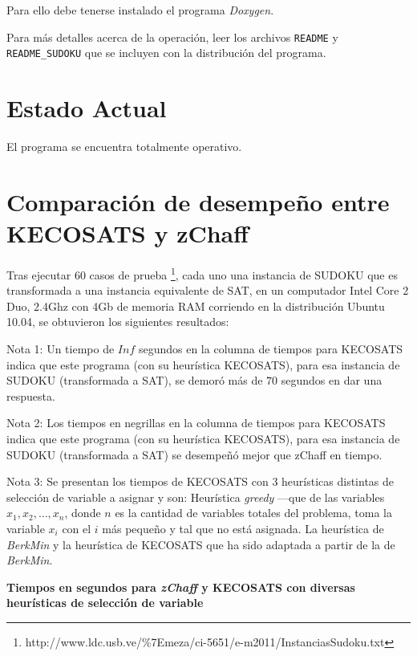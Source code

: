 \documentclass[12pt,lettersize,oneside]{article}
\begin{document}
Para ello debe tenerse instalado el programa \emph{Doxygen}.

Para más detalles acerca de la operación, leer los archivos {\tt README} y {\tt
  README\_SUDOKU} que se incluyen con la distribución del programa.
\section{Estado Actual}
El programa se encuentra totalmente operativo.

\section{Comparación de desempeño entre KECOSATS y zChaff}

Tras ejecutar $60$ casos de prueba
\footnote{http://www.ldc.usb.ve/\%7Emeza/ci-5651/e-m2011/InstanciasSudoku.txt},
cada uno una instancia de SUDOKU que es transformada a una instancia equivalente
de SAT, en un computador Intel Core 2 Duo, 2.4Ghz con 4Gb de memoria RAM
corriendo en la distribución Ubuntu 10.04, se
obtuvieron los siguientes resultados:

Nota 1: Un tiempo de $Inf$ segundos en la columna de tiempos para KECOSATS
indica que este programa (con su heurística KECOSATS), para esa instancia de
SUDOKU (transformada a SAT), se demoró más de $70$ segundos en dar una
respuesta.

Nota 2: Los tiempos en negrillas en la columna de tiempos para KECOSATS indica
que este programa (con su heurística KECOSATS), para esa instancia de SUDOKU
(transformada a SAT) se desempeñó mejor que zChaff en tiempo.

Nota 3: Se presentan los tiempos de KECOSATS con 3 heurísticas distintas de
selección de variable a asignar y son: Heurística \emph{greedy} ---que
de las variables $x_1,x_2,\ldots,x_n$, donde $n$ es la cantidad de variables
totales del problema, toma la variable $x_i$ con el $i$ más pequeño y tal que no
está asignada. La heurística de \emph{BerkMin} y la heurística de KECOSATS que
ha sido adaptada a partir de la de \emph{BerkMin}.
\begin{center}\textbf{ Tiempos en segundos para \emph{zChaff} y KECOSATS con diversas heurísticas de selección de variable}\end{center}\vspace{-2.5mm}

\end{document}
